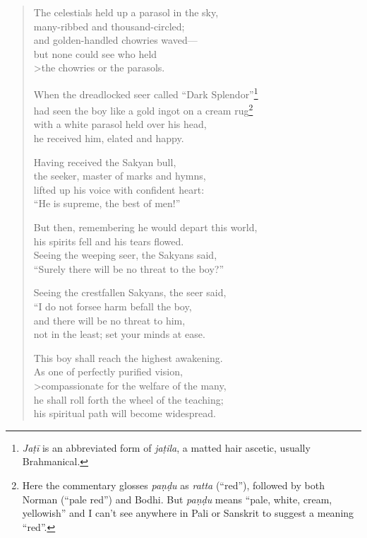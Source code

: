 \documentclass[12pt,openany]{book}%
\begin{document}
\begin{verse}
The celestials held up a parasol in the sky, \\
many-ribbed and thousand-circled; \\
and golden-handled chowries waved—\\
but none could see who held \\>the chowries or the parasols. 

When the dreadlocked seer called “Dark Splendor”\footnote{\textit{\textsanskrit{Jaṭī}} is an abbreviated form of \textit{\textsanskrit{jaṭila}}, a matted hair ascetic, usually Brahmanical. } \\
had seen the boy like a gold ingot on a cream rug\footnote{Here the commentary glosses \textit{\textsanskrit{paṇḍu}} as \textit{ratta} (“red”), followed by both Norman (“pale red”) and Bodhi. But \textit{\textsanskrit{paṇḍu}} means “pale, white, cream, yellowish” and I can’t see anywhere in Pali or Sanskrit to suggest a meaning “red”. } \\
with a white parasol held over his head, \\
he received him, elated and happy. 

Having received the Sakyan bull, \\
the seeker, master of marks and hymns, \\
lifted up his voice with confident heart: \\
“He is supreme, the best of men!” 

But then, remembering he would depart this world, \\
his spirits fell and his tears flowed. \\
Seeing the weeping seer, the Sakyans said, \\
“Surely there will be no threat to the boy?” 

Seeing the crestfallen Sakyans, the seer said, \\
“I do not forsee harm befall the boy, \\
and there will be no threat to him, \\
not in the least; set your minds at ease. 

This boy shall reach the highest awakening. \\
As one of perfectly purified vision, \\>compassionate for the welfare of the many, \\
he shall roll forth the wheel of the teaching; \\
his spiritual path will become widespread. 


\end{verse}
\end{document}

